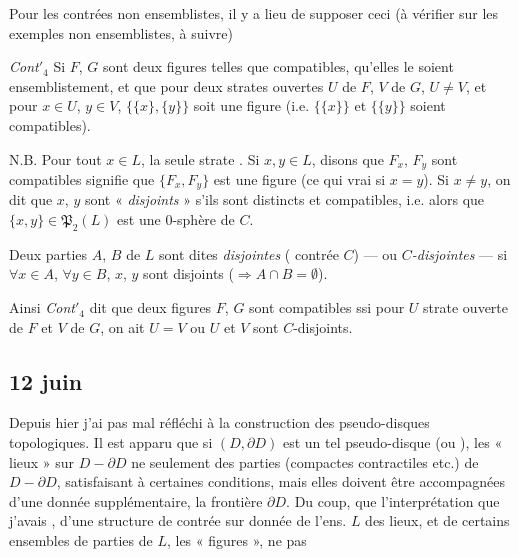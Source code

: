 \documentclass[11pt,a4paper]{article}
\begin{document}
Pour les contrées non ensemblistes, il y a lieu de supposer ceci (à vérifier sur les exemples  non ensemblistes, à suivre)

\emph{Cont$'_4$} \quad Si $F$, $G$ sont deux figures \struck{\ill{}} telles que \ill{} \ill{} compatibles, \ill{} qu'elles le soient ensemblistement, et que pour deux strates ouvertes $U$ de $F$, $V$ de $G$,  $U \neq V$, et pour  $x \in U$, $y \in V$,  $\{\{x\}, \{y\}\}$ soit une figure (i.e. $\{\{x\}\}$ et $\{\{y\}\}$ soient compatibles).

N.B. Pour tout $x \in L$, \ill{} \struck{\ill{}} \add{\ill{}} la seule strate \struck{\ill{}}. Si $x, y \in L$, disons que $F_x$, $F_y$ sont compatibles signifie que $\{F_x, F_y\}$ est \struck{\ill{}} une figure (ce qui  vrai si $x = y$). Si $x \neq y$,  on dit que $x$, $y$ sont « \emph{disjoints} » s'ils sont distincts et compatibles, i.e. \ill{} alors que $\{x, y\} \in \mathfrak{P}_2(L)$ est une $0$-sphère de $C$.

Deux parties $A$, $B$ de $L$ sont dites \emph{disjointes} (\ill{} contrée $C$) — ou \emph{$C$-disjointes} — si $\forall x \in A$, $\forall y \in B$, $x$, $y$ sont disjoints ($\Rightarrow A \cap B = \emptyset$).

Ainsi \emph{Cont$'_4$} dit que deux figures $F$, $G$ sont compatibles ssi pour $U$ strate ouverte de $F$ et $V$ de $G$,  on ait $U = V$ ou $U$ et $V$ sont $C$-disjoints.

\subsection{12 juin}

Depuis hier j'ai pas mal réfléchi à la construction des pseudo-disques topologiques. Il est apparu que si \struck{\ill{}} $(D, \partial D)$ est un tel pseudo-disque (ou \ill{}), les « lieux » sur $D - \partial D$ ne  \struck{\ill{}} \ill{} seulement des parties (compactes contractiles etc.) de $D - \partial D$, satisfaisant à certaines conditions, mais elles doivent être accompagnées d'une donnée supplémentaire, \ill{} \ill{} \ill{} la frontière \ill{} $\partial D$. Du coup, \ill{} que l'interprétation \struck{\ill{}} que j'avais \ill{}, d'une structure de contrée sur \ill{} donnée de l'ens. $L$ des lieux, et de certains ensembles de parties de $L$, les « figures », ne \ill{} pas
\end{document}
